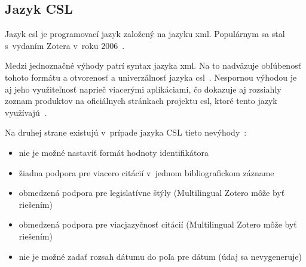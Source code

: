 \documentclass[
  color,
  table,
  nolof,
  oneside,
]{fithesis3}
\begin{document}
\subsection{Jazyk CSL}\label{zotero:csl}

Jazyk \gls{csl} je programovací jazyk založený na jazyku \gls{xml}. Populárnym sa stal s~vydaním Zotera v~roku 2006~\cite{Fenner2010}.

Medzi jednoznačné výhody patrí syntax jazyka \gls{xml}. Na to nadväzuje obľúbenosť tohoto formátu a otvorenosť a univerzálnosť jazyka \gls{csl}~\cite{Ansorge2013}. Nespornou výhodou je aj jeho využiteľnosť naprieč viacerými aplikáciami, čo dokazuje aj rozsiahly zoznam produktov na oficiálnych stránkach projektu \gls{csl}, ktoré tento jazyk využívajú~\cite{csl:home}.

Na druhej strane existujú v~prípade jazyka CSL tieto nevýhody~\cite{csl:styles}:


\begin{itemize}
\item nie je možné nastaviť formát hodnoty identifikátora
\item žiadna podpora pre viacero citácií v~jednom bibliografickom zázname
\item obmedzená podpora pre legislatívne štýly (Multilingual Zotero môže byť riešením)
\item obmedzená podpora pre viacjazyčnosť citácií (Multilingual Zotero môže byť riešením)
\item nie je možné zadať rozsah dátumu do poľa pre dátum (údaj sa nevygeneruje)
\end{itemize}

\end{document}
